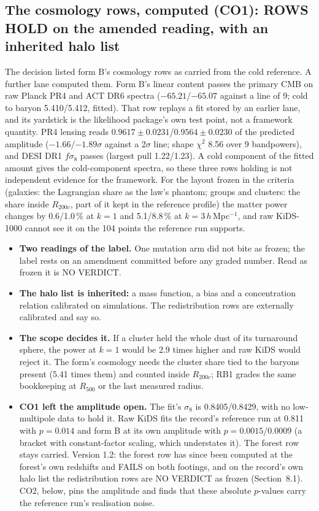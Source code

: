 \documentclass[10pt]{article}
\begin{document}
\subsection{The cosmology rows, computed (CO1): ROWS HOLD on the amended reading, with an inherited halo list}
The decision listed form B's cosmology rows as carried from the cold reference. A further lane computed them. Form B's linear content passes the primary CMB on raw Planck PR4 and ACT DR6 spectra ($-65.21$/$-65.07$ against a line of 9; cold to baryon 5.410/5.412, fitted). That row replays a fit stored by an earlier lane, and its yardstick is the likelihood package's own test point, not a framework quantity. PR4 lensing reads $0.9617\pm0.0231$/$0.9564\pm0.0230$ of the predicted amplitude ($-1.66$/$-1.89\sigma$ against a 2$\sigma$ line; shape $\chi^2$ 8.56 over 9 bandpowers), and DESI DR1 $f\sigma_8$ passes (largest pull 1.22/1.23). A cold component of the fitted amount gives the cold-component spectra, so these three rows holding is not independent evidence for the framework. For the layout frozen in the criteria (galaxies: the Lagrangian share as the law's phantom; groups and clusters: the share inside $R_{200c}$, part of it kept in the reference profile) the matter power changes by 0.6/1.0\,\% at $k=1$ and 5.1/8.8\,\% at $k=3\,h$\,Mpc$^{-1}$, and raw KiDS-1000 cannot see it on the 104 points the reference run supports.
\begin{itemize}
\item \textbf{Two readings of the label.} One mutation arm did not bite as frozen; the label rests on an amendment committed before any graded number. Read as frozen it is NO VERDICT.
\item \textbf{The halo list is inherited:} a mass function, a bias and a concentration relation calibrated on simulations. The redistribution rows are externally calibrated and say so.
\item \textbf{The scope decides it.} If a cluster held the whole dust of its turnaround sphere, the power at $k=1$ would be 2.9 times higher and raw KiDS would reject it. The form's cosmology needs the cluster share tied to the baryons present (5.41 times them) and counted inside $R_{200c}$; RB1 grades the same bookkeeping at $R_{500}$ or the last measured radius.
\item \textbf{CO1 left the amplitude open.} The fit's $\sigma_8$ is 0.8405/0.8429, with no low-multipole data to hold it. Raw KiDS fits the record's reference run at 0.811 with $p=0.014$ and form B at its own amplitude with $p=0.0015$/0.0009 (a bracket with constant-factor scaling, which understates it). The forest row stays carried. Version 1.2: the forest row has since been computed at the forest's own redshifts and FAILS on both footings, and on the record's own halo list the redistribution rows are NO VERDICT as frozen (Section~8.1). CO2, below, pins the amplitude and finds that these absolute $p$-values carry the reference run's realisation noise.
\end{itemize}
\end{document}
